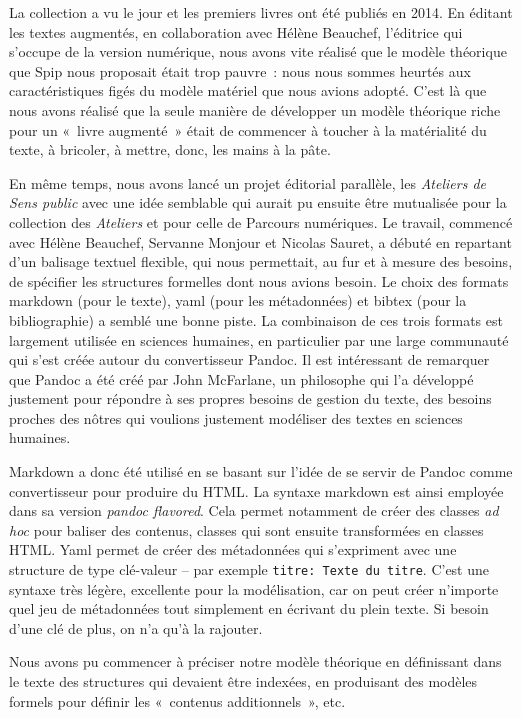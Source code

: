 La collection a vu le jour et les premiers livres ont été publiés en
2014. En éditant les textes augmentés, en collaboration avec Hélène
Beauchef, l'éditrice qui s'occupe de la version numérique, nous avons
vite réalisé que le modèle théorique que Spip nous proposait était trop
pauvre~: nous nous sommes heurtés aux caractéristiques figés du modèle
matériel que nous avions adopté. C'est là que nous avons réalisé que la
seule manière de développer un modèle théorique riche pour un «~livre
augmenté~» était de commencer à toucher à la matérialité du texte, à
bricoler, à mettre, donc, les mains à la pâte.

En même temps, nous avons lancé un projet éditorial parallèle, les
\emph{Ateliers de Sens public} avec une idée semblable qui aurait pu
ensuite être mutualisée pour la collection des \emph{Ateliers} et pour
celle de Parcours numériques. Le travail, commencé avec Hélène Beauchef,
Servanne Monjour et Nicolas Sauret, a débuté en repartant d'un balisage
textuel flexible, qui nous permettait, au fur et à mesure des besoins,
de spécifier les structures formelles dont nous avions besoin. Le choix
des formats markdown (pour le texte), yaml (pour les métadonnées) et
bibtex (pour la bibliographie) a semblé une bonne piste. La combinaison
de ces trois formats est largement utilisée en sciences humaines, en
particulier par une large communauté qui s'est créée autour du
convertisseur Pandoc. Il est intéressant de remarquer que Pandoc a été
créé par John McFarlane, un philosophe qui l'a développé justement pour
répondre à ses propres besoins de gestion du texte, des besoins proches
des nôtres qui voulions justement modéliser des textes en sciences
humaines.

Markdown a donc été utilisé en se basant sur l'idée de se servir de
Pandoc comme convertisseur pour produire du HTML. La syntaxe markdown
est ainsi employée dans sa version \emph{pandoc flavored}. Cela permet
notamment de créer des classes \emph{ad hoc} pour baliser des contenus,
classes qui sont ensuite transformées en classes HTML. Yaml permet de
créer des métadonnées qui s'expriment avec une structure de type
clé-valeur -- par exemple \texttt{titre:\ Texte\ du\ titre}. C'est une
syntaxe très légère, excellente pour la modélisation, car on peut créer
n'importe quel jeu de métadonnées tout simplement en écrivant du plein
texte. Si besoin d'une clé de plus, on n'a qu'à la rajouter.

Nous avons pu commencer à préciser notre modèle théorique en définissant
dans le texte des structures qui devaient être indexées, en produisant
des modèles formels pour définir les «~contenus additionnels~», etc.

